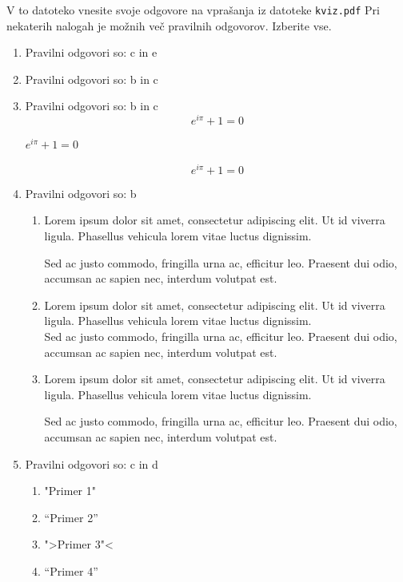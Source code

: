\documentclass[11pt]{article}
\begin{document}
V to datoteko vnesite svoje odgovore na vprašanja iz datoteke \texttt{kviz.pdf}
Pri nekaterih nalogah je možnih več pravilnih odgovorov. Izberite vse.

\begin{enumerate}
    \item Pravilni odgovori so: c in e%
    
    \item Pravilni odgovori so: b in c %
    
    \item Pravilni odgovori so: b in c  %
      \[ e^{i \pi} + 1 = 0 \]
      \begin{center}
          \( e^{i \pi} + 1 = 0 \)
      \end{center}
      \begin{equation*}
          e^{i \pi} + 1 = 0
      \end{equation*}

    \item Pravilni odgovori so: b %
        \begin{enumerate}
            \item {
Lorem ipsum dolor sit amet, consectetur adipiscing 
elit. Ut id viverra ligula. Phasellus vehicula lorem 
vitae luctus dignissim. 
                
Sed ac justo commodo, fringilla urna ac, efficitur 
leo. Praesent dui odio, accumsan ac sapien nec, 
interdum volutpat est. 
            }
            \item {
Lorem ipsum dolor sit amet, consectetur adipiscing 
elit. Ut id viverra ligula. Phasellus vehicula lorem 
vitae luctus dignissim. \\
Sed ac justo commodo, fringilla urna ac, efficitur 
leo. Praesent dui odio, accumsan ac sapien nec, 
interdum volutpat est.             }
            \item {
Lorem ipsum dolor sit amet, consectetur adipiscing 
elit. Ut id viverra ligula. Phasellus vehicula lorem 
vitae luctus dignissim. \par
Sed ac justo commodo, fringilla urna ac, efficitur 
leo. Praesent dui odio, accumsan ac sapien nec, 
interdum volutpat est.             }
        \end{enumerate}
    
      \item Pravilni odgovori so: c in d%
        \begin{enumerate}
          \item "Primer 1"
          \item ``Primer 2''
          \item ">Primer 3"<
          \item "`Primer 4"'
        \end{enumerate}


\end{enumerate}
\end{document}
